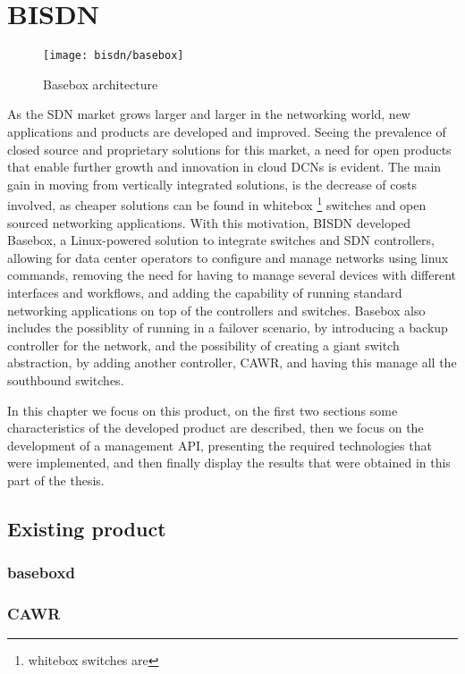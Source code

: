 \chapter {BISDN} \label{chap:bisdn} %

\begin{figure} [!htbp]
    \centering
    \texttt{[image: bisdn/basebox]}
    \caption{Basebox architecture}
\end{figure}

As the SDN market grows larger and larger in the networking world, new applications and products are developed and improved. Seeing the prevalence of closed source and proprietary solutions for this market, a need for open
products that enable further growth and innovation in cloud DCNs is evident. The main gain in moving from vertically integrated solutions, is the decrease of costs involved, as cheaper solutions can be found in whitebox 
\footnote {whitebox switches are} switches and open sourced networking applications. With this motivation, BISDN developed Basebox, a Linux-powered solution to integrate switches and SDN controllers, allowing for data center 
operators to configure and manage networks using linux commands, removing the need for having to manage several devices with different interfaces and workflows, and adding the capability of running standard networking applications 
on top of the controllers and switches. Basebox also includes the possiblity of running in a failover scenario, by introducing a backup controller for the network, and the possibility of creating a giant switch abstraction, 
by adding another controller, CAWR, and having this manage all the southbound switches.

\par In this chapter we focus on this product, on the first two sections some characteristics of the developed product are described, then we focus on the development of a management API, presenting the required technologies that 
were implemented, and then finally display the results that were obtained in this part of the thesis.

\section {Existing product}

\subsection {baseboxd}
\subsection {CAWR}

